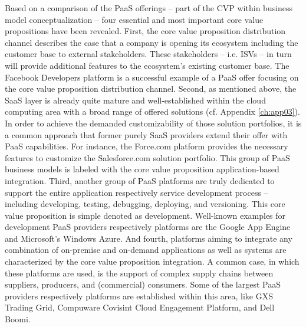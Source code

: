 Based on a comparison of the \ac{PaaS} offerings -- part of the \ac{CVP} within \citet{Johnson2008} business model conceptualization -- four essential and most important core value propositions have been revealed.  First, the core value proposition distribution channel describes the case that a company is opening its ecosystem including the customer base to external stakeholders. These stakeholders -- i.e. \acp{ISV} -- in turn will provide additional features to the ecosystem's existing customer base. The Facebook Developers platform is a successful example of a \ac{PaaS} offer focusing on the core value proposition distribution channel. Second, as mentioned above, the \ac{SaaS} layer is already quite mature and well-established within the cloud computing area with a broad range of offered solutions (cf. Appendix \ref{ch:app03}). In order to achieve the demanded customizability of those solution portfolios, it is a common approach that former purely \ac{SaaS} providers extend their offer with \ac{PaaS} capabilities. For instance, the Force.com platform provides the necessary features to customize the Salesforce.com solution portfolio. This group of \ac{PaaS} business models is labeled with the core value proposition application-based integration. Third, another group of \ac{PaaS} platforms are truly dedicated to support the entire application respectively service development process -- including developing, testing, debugging, deploying, and versioning. This core value proposition is simple denoted as development. Well-known examples for development \ac{PaaS} providers respectively platforms are the Google App Engine and Microsoft's Windows Azure. And fourth, platforms aiming to integrate any combination of on-premise and on-demand applications as well as systems are characterized by the core value proposition integration. A common case, in which these platforms are used, is the support of complex supply chains between suppliers, producers, and (commercial) consumers. Some of the largest \ac{PaaS} providers respectively platforms are established within this area, like GXS Trading Grid, Compuware Covisint Cloud Engagement Platform, and Dell Boomi.

